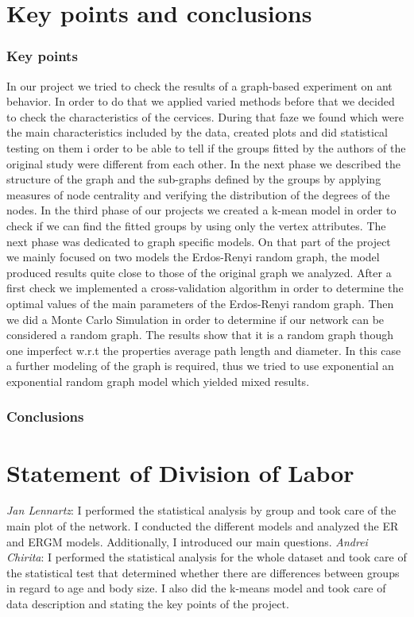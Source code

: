 \documentclass[
]{article}
\begin{document}
\hypertarget{key-points-and-conclusions}{%
\section{Key points and conclusions}\label{key-points-and-conclusions}}

\hypertarget{key-points}{%
\subsubsection{Key points}\label{key-points}}

In our project we tried to check the results of a graph-based experiment
on ant behavior. In order to do that we applied varied methods before
that we decided to check the characteristics of the cervices. During
that faze we found which were the main characteristics included by the
data, created plots and did statistical testing on them i order to be
able to tell if the groups fitted by the authors of the original study
were different from each other. In the next phase we described the
structure of the graph and the sub-graphs defined by the groups by
applying measures of node centrality and verifying the distribution of
the degrees of the nodes. In the third phase of our projects we created
a k-mean model in order to check if we can find the fitted groups by
using only the vertex attributes. The next phase was dedicated to graph
specific models. On that part of the project we mainly focused on two
models the Erdos-Renyi random graph, the model produced results quite
close to those of the original graph we analyzed. After a first check we
implemented a cross-validation algorithm in order to determine the
optimal values of the main parameters of the Erdos-Renyi random graph.
Then we did a Monte Carlo Simulation in order to determine if our
network can be considered a random graph. The results show that it is a
random graph though one imperfect w.r.t the properties average path
length and diameter. In this case a further modeling of the graph is
required, thus we tried to use exponential an exponential random graph
model which yielded mixed results.

\hypertarget{conclusions}{%
\subsubsection{Conclusions}\label{conclusions}}

\hypertarget{statement-of-division-of-labor}{%
\section{Statement of Division of
Labor}\label{statement-of-division-of-labor}}

\emph{Jan Lennartz}: I performed the statistical analysis by group and
took care of the main plot of the network. I conducted the different
models and analyzed the ER and ERGM models. Additionally, I introduced
our main questions. \emph{Andrei Chirita}: I performed the statistical
analysis for the whole dataset and took care of the statistical test
that determined whether there are differences between groups in regard
to age and body size. I also did the k-means model and took care of data
description and stating the key points of the project.
\end{document}
